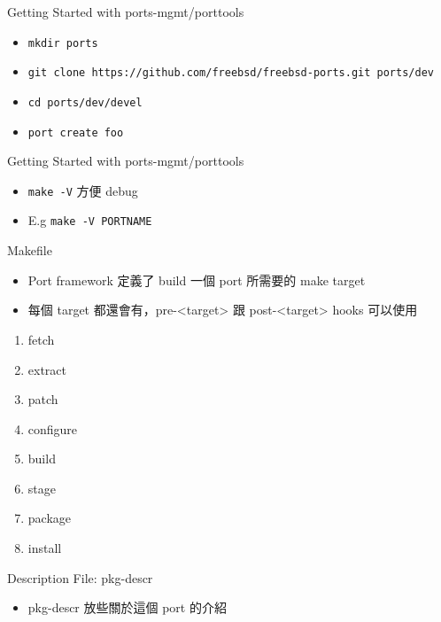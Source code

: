 \documentclass[aspectratio=169]{beamer}
\begin{document}
\begin{frame}[t,fragile]{Getting Started with ports-mgmt/porttools}
  \begin{itemize}
    \item \verb`mkdir ports`
    \item \verb`git clone https://github.com/freebsd/freebsd-ports.git ports/dev`
    \item \verb`cd ports/dev/devel`
    \item \verb`port create foo`
  \end{itemize}
\end{frame}

\begin{frame}[t,fragile]{Getting Started with ports-mgmt/porttools}
  \begin{itemize}
    \item \verb|make -V| 方便 debug
    \item E.g \verb|make -V PORTNAME|
  \end{itemize}
\end{frame}

\begin{frame}[t]{Makefile}
  \begin{itemize}
    \item Port framework 定義了 build 一個 port 所需要的 make target
    \item 每個 target 都還會有，pre-<target> 跟 post-<target> hooks 可以使用
  \end{itemize}
  \begin{enumerate}
    \item fetch
    \item extract
    \item patch
    \item configure
    \item build
    \item stage
    \item package
    \item install
  \end{enumerate}
\end{frame}

\begin{frame}[t,fragile]{Description File: pkg-descr}
  \begin{itemize}
    \item pkg-descr 放些關於這個 port 的介紹
  \end{itemize}
\end{frame}
\end{document}
